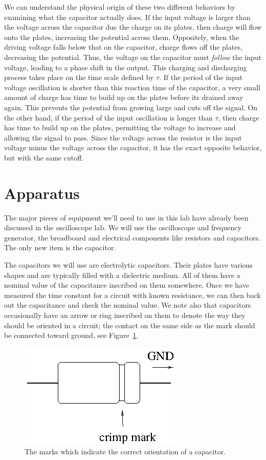 We can understand the physical origin of these two different behaviors by 
examining what the capacitor actually does. If the input voltage is larger than
the voltage across the capacitor due the charge on its plates, then charge will
flow onto the plates, increasing the potential across them. Oppositely, when 
the driving voltage falls below that on the capacitor, charge flows off the plates, decreasing the potential. Thus, the voltage on the capacitor must 
{\em follow} the input voltage, leading to a phase shift in the output. This 
charging and discharging process takes place on the time scale defined by 
$\tau$. If the period of the input voltage oscillation is shorter than this
reaction time of the capacitor, a very small amount of charge has time to 
build up on the plates before its drained away again. This prevents the 
potential from growing large and cuts off the signal. On the other hand, if 
the period of the input oscillation is longer than $\tau$, then charge has 
time to build up on the plates, permitting the voltage to increase and allowing
the signal to pass. Since the voltage across the resistor is the input voltage
minus the voltage across the capacitor, it has the exact opposite behavior, but
with the same cutoff.

\section{Apparatus}

The major pieces of equipment we'll need to use in this lab have already been 
discussed in the oscilloscope lab. We will use the oscilloscope and frequency
generator, the breadboard and electrical components like resistors and 
capacitors. The only new item is the capacitor.

The capacitors we will use are electrolytic capacitors. Their plates have 
various shapes and are typically filled with a dielectric medium.
All of them have a nominal value of the capacitance inscribed on them somewhere.
Once we have measured the
time constant for a circuit with known resistance, we can then back out the 
capacitance and check the nominal value.  We note also that capacitors 
occasionally have an arrow or ring inscribed on them to denote the way they 
should be oriented in a circuit; the contact on the same side as the mark 
should be connected toward ground, see Figure~\ref{fig:rc:capacitor}.  
\begin{figure}[htb]
\centering 
\epsfxsize=9cm \includegraphics{5_rccircuits/capacitor.eps}
\caption{The marks which indicate the correct orientation of a capacitor.}
\label{fig:rc:capacitor}
\end{figure}

